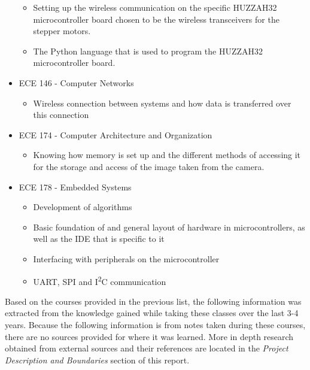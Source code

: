 \begin{itemize}
	\begin{itemize}
		\item Setting up the wireless communication on the specific HUZZAH32 microcontroller board chosen to be the wireless transceivers for the stepper motors.
		\item The Python language that is used to program the HUZZAH32 microcontroller board.
	\end{itemize}
\item ECE 146 - Computer Networks
	\begin{itemize}
		\item Wireless connection between systems and how data is transferred over this connection
	\end{itemize}
\item ECE 174 - Computer Architecture and Organization
	\begin{itemize}
		\item Knowing how memory is set up and the different methods of accessing it for the storage and access of the image taken from the camera.
	\end{itemize}
\item ECE 178 - Embedded Systems
	\begin{itemize}
		\item Development of algorithms
		\item Basic foundation of and general layout of hardware in microcontrollers, as well as the IDE that is specific to it
		\item Interfacing with peripherals on the microcontroller
		\item UART, SPI and I\textsuperscript{2}C communication
	\end{itemize}
\end{itemize}\par
 
Based on the courses provided in the previous list, the following information was extracted from the knowledge gained while taking these classes over the last 3-4 years. Because the following information is from notes taken during these courses, there are no sources provided for where it was learned. More in depth research obtained from external sources and their references are located in the \textit{Project Description and Boundaries} section of this report.\\

